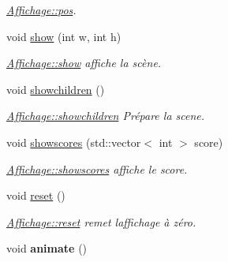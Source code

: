 \begin{DoxyCompactItemize}
\begin{DoxyCompactList}\small\item\em \hyperlink{class_affichage_addd80e1c405b812b62aac143be89c47f}{Affichage\+::pos}. \end{DoxyCompactList}\item 
void \hyperlink{class_affichage_a1ba483b173be9255ce66d08ac8c230f5}{show} (int w, int h)
\begin{DoxyCompactList}\small\item\em \hyperlink{class_affichage_a1ba483b173be9255ce66d08ac8c230f5}{Affichage\+::show} affiche la scène. \end{DoxyCompactList}\item 
\hypertarget{class_affichage_a681444f42b59e56a1cf671b1218ddde4}{}void \hyperlink{class_affichage_a681444f42b59e56a1cf671b1218ddde4}{showchildren} ()\label{class_affichage_a681444f42b59e56a1cf671b1218ddde4}

\begin{DoxyCompactList}\small\item\em \hyperlink{class_affichage_a681444f42b59e56a1cf671b1218ddde4}{Affichage\+::showchildren} Prépare la scene. \end{DoxyCompactList}\item 
void \hyperlink{class_affichage_adc425b2e8d02ca2e87ac9efe53d7ca1a}{showscores} (std\+::vector$<$ int $>$ score)
\begin{DoxyCompactList}\small\item\em \hyperlink{class_affichage_adc425b2e8d02ca2e87ac9efe53d7ca1a}{Affichage\+::showscores} affiche le score. \end{DoxyCompactList}\item 
\hypertarget{class_affichage_a54e6fd4b234f9688f21c0f2a7e6df287}{}void \hyperlink{class_affichage_a54e6fd4b234f9688f21c0f2a7e6df287}{reset} ()\label{class_affichage_a54e6fd4b234f9688f21c0f2a7e6df287}

\begin{DoxyCompactList}\small\item\em \hyperlink{class_affichage_a54e6fd4b234f9688f21c0f2a7e6df287}{Affichage\+::reset} remet l\textquotesingle{}affichage à zéro. \end{DoxyCompactList}\item 
\hypertarget{class_affichage_a645efcf13fd7cbbd423dd1c495fc9271}{}void {\bfseries animate} ()\label{class_affichage_a645efcf13fd7cbbd423dd1c495fc9271}


\end{DoxyCompactItemize}
